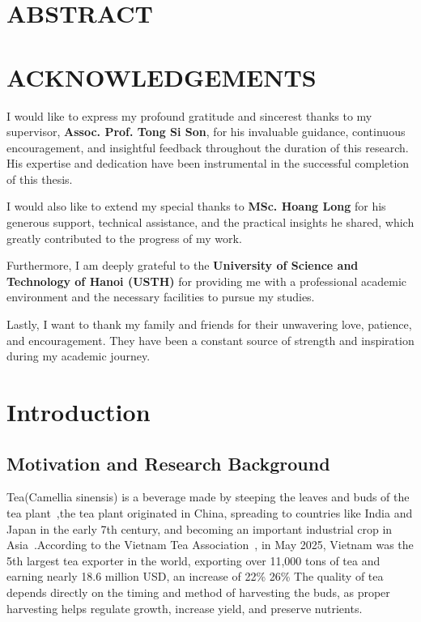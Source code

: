\documentclass[a4paper,12pt]{report}
\begin{document}
\clearpage
\listoftables

\clearpage


\chapter*{ABSTRACT}
 

\clearpage

\chapter*{ACKNOWLEDGEMENTS}
I would like to express my profound gratitude and sincerest thanks to my supervisor, \textbf{Assoc. Prof. Tong Si Son}, for his invaluable guidance, continuous encouragement, and insightful feedback throughout the duration of this research. His expertise and dedication have been instrumental in the successful completion of this thesis.

I would also like to extend my special thanks to \textbf{MSc. Hoang Long} for his generous support, technical assistance, and the practical insights he shared, which greatly contributed to the progress of my work.

Furthermore, I am deeply grateful to the \textbf{University of Science and Technology of Hanoi (USTH)} for providing me with a professional academic environment and the necessary facilities to pursue my studies.

Lastly, I want to thank my family and friends for their unwavering love, patience, and encouragement. They have been a constant source of strength and inspiration during my academic journey.


\clearpage

\chapter{Introduction}
\section{Motivation and Research Background}
Tea(Camellia sinensis) is a beverage made by steeping the leaves and buds of the tea plant~\cite{BritannicaTea},the tea plant originated in China, spreading to countries like India and Japan in the early 7th century, and becoming an important industrial crop in Asia~\cite{TravinaTea}.According to the Vietnam Tea Association~\cite{VITAS2025}, in May 2025, Vietnam was the 5th largest tea exporter in the world, exporting over 11,000 tons of tea and earning nearly 18.6 million USD, an increase of 22\%  26\% 
The quality of tea ~\cite{AgritradeTea} depends directly on the timing and method of harvesting the buds, as proper harvesting helps regulate growth, increase yield, and preserve nutrients.
\end{document}
